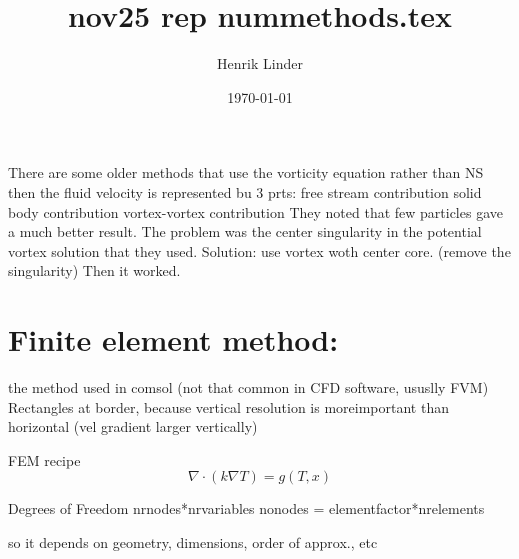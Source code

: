 \documentclass{article}
\title{nov25 rep nummethods.tex }
\author{Henrik Linder}
\date{\today}
\begin{document}
\maketitle

There are some older methods that use the vorticity equation rather than NS
then the fluid velocity is represented bu 3 prts:	
	free stream contribution
	solid body contribution
	vortex-vortex contribution
They noted that few particles gave a much better result. The problem was the center singularity in the potential vortex solution that they used. Solution: use vortex woth center core. (remove the singularity) Then it worked.

\section{Finite element method:} 
the method used in comsol (not that common in CFD software, ususlly FVM)
Rectangles at border, because vertical resolution is moreimportant than horizontal (vel gradient larger vertically)

FEM recipe 
\begin{equation}
	\nabla\cdot(k\nabla T) = g(T,x)
\end{equation}

Degrees of Freedom 
nrnodes*nrvariables
nonodes = elementfactor*nrelements

so it depends on geometry, dimensions, order of approx., etc
\end{document}
